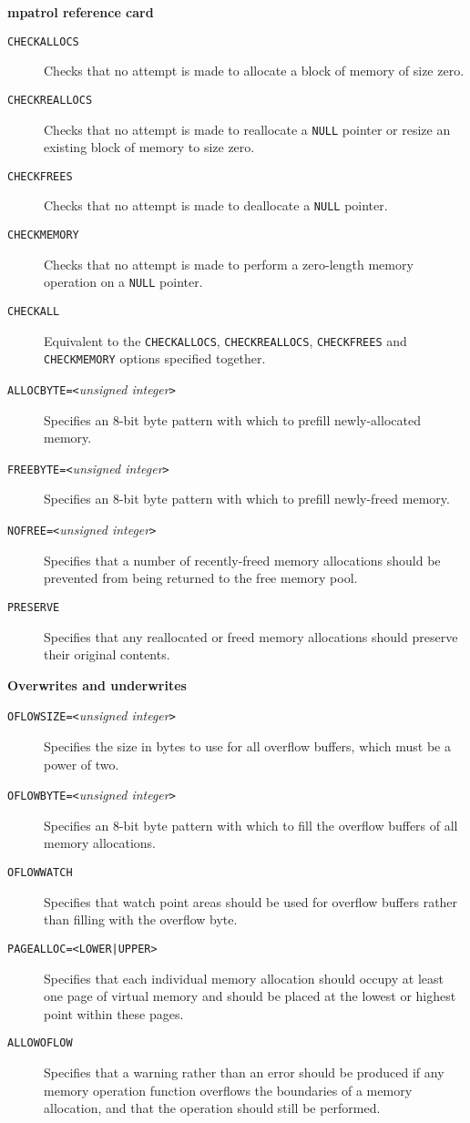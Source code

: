 \documentclass[a4paper,landscape,final]{article}
\newcommand{\heading}[1]{\textbf{\normalsize #1}}
\newcommand{\option}[1]{\texttt{#1}}
\newcommand{\optionarg}[2]{\option{#1}\texttt{=<#2>}}
\newcommand{\optionpar}[2]{\option{#1}\texttt{=<}\textit{#2}\texttt{>}}
\begin{document}
\begin{multicols}{3}{\textbf{\Large mpatrol reference card}}
\begin{description}
\item[\option{CHECKALLOCS}]
Checks that no attempt is made to allocate a block of memory of size zero.
\item[\option{CHECKREALLOCS}]
Checks that no attempt is made to reallocate a \texttt{NULL} pointer or resize
an existing block of memory to size zero.
\item[\option{CHECKFREES}]
Checks that no attempt is made to deallocate a \texttt{NULL} pointer.
\item[\option{CHECKMEMORY}]
Checks that no attempt is made to perform a zero-length memory operation on a
\texttt{NULL} pointer.
\item[\option{CHECKALL}]
Equivalent to the \option{CHECKALLOCS}, \option{CHECKREALLOCS},
\option{CHECKFREES} and \option{CHECKMEMORY} options specified together.
\item[\optionpar{ALLOCBYTE}{unsigned integer}]
Specifies an 8-bit byte pattern with which to prefill newly-allocated memory.
\item[\optionpar{FREEBYTE}{unsigned integer}]
Specifies an 8-bit byte pattern with which to prefill newly-freed memory.
\item[\optionpar{NOFREE}{unsigned integer}]
Specifies that a number of recently-freed memory allocations should be prevented
from being returned to the free memory pool.
\item[\option{PRESERVE}]
Specifies that any reallocated or freed memory allocations should preserve their
original contents.
\end{description}

\vskip 12pt
\heading{Overwrites and underwrites}
\vskip 6pt

\begin{description}
\item[\optionpar{OFLOWSIZE}{unsigned integer}]
Specifies the size in bytes to use for all overflow buffers, which must be a
power of two.
\item[\optionpar{OFLOWBYTE}{unsigned integer}]
Specifies an 8-bit byte pattern with which to fill the overflow buffers of all
memory allocations.
\item[\option{OFLOWWATCH}]
Specifies that watch point areas should be used for overflow buffers rather than
filling with the overflow byte.
\item[\optionarg{PAGEALLOC}{LOWER|UPPER}]
Specifies that each individual memory allocation should occupy at least one page
of virtual memory and should be placed at the lowest or highest point within
these pages.
\item[\option{ALLOWOFLOW}]
Specifies that a warning rather than an error should be produced if any memory
operation function overflows the boundaries of a memory allocation, and that
the operation should still be performed.
\end{description}


\end{multicols}
\end{document}
